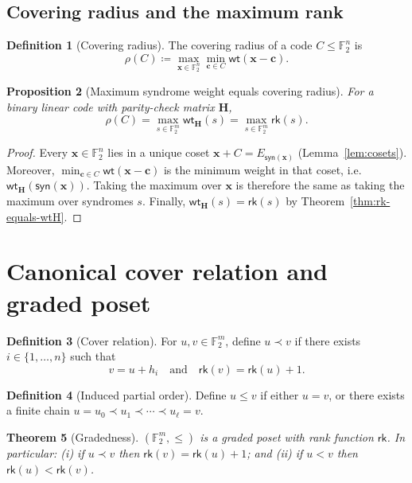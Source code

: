 \documentclass[11pt,twoside,leqno]{article}
\theoremstyle{definition}
\newtheorem{definition}{Definition}[section]
\theoremstyle{plain}
\newtheorem{theorem}[definition]{Theorem}
\newtheorem{proposition}[definition]{Proposition}
\theoremstyle{remark}
\newcommand{\Ftwo}{\mathbb{F}_2}
\newcommand{\wt}{\mathsf{wt}}
\newcommand{\syn}{\mathsf{syn}}
\newcommand{\rk}{\mathsf{rk}}
\newcommand{\HH}{\mathbf{H}}
\newcommand{\xx}{\mathbf{x}}
\newcommand{\cc}{\mathbf{c}}
\newcommand{\covrad}{\rho}
\begin{document}
\subsection{Covering radius and the maximum rank}
\begin{definition}[Covering radius]\label{def:coveringradius}
The covering radius of a code $C\le \Ftwo^n$ is
\[
\covrad(C)\coloneqq \max_{\xx\in\Ftwo^n}\min_{\cc\in C}\wt(\xx-\cc).
\]
\end{definition}

\begin{proposition}[Maximum syndrome weight equals covering radius]\label{prop:rho}
For a binary linear code with parity-check matrix $\HH$,
\[
\covrad(C)=\max_{s\in\Ftwo^m}\wt_{\HH}(s)=\max_{s\in\Ftwo^m}\rk(s).
\]
\end{proposition}

\begin{proof}
Every $\xx\in\Ftwo^n$ lies in a unique coset $\xx+C=E_{\syn(\xx)}$ (Lemma~\ref{lem:cosets}).
Moreover, $\min_{\cc\in C}\wt(\xx-\cc)$ is the minimum weight in that coset, i.e.\ $\wt_{\HH}(\syn(\xx))$.
Taking the maximum over $\xx$ is therefore the same as taking the maximum over syndromes $s$.
Finally, $\wt_{\HH}(s)=\rk(s)$ by Theorem~\ref{thm:rk-equals-wtH}.
\end{proof}

\section{Canonical cover relation and graded poset}\label{sec:poset}

\begin{definition}[Cover relation]\label{def:cover}
For $u,v\in\Ftwo^m$, define $u\prec v$ if there exists $i\in\{1,\dots,n\}$ such that
\[
v=u+h_i
\quad\text{and}\quad
\rk(v)=\rk(u)+1.
\]
\end{definition}

\begin{definition}[Induced partial order]\label{def:order}
Define $u\le v$ if either $u=v$, or there exists a finite chain
$u=u_0\prec u_1\prec\cdots\prec u_\ell=v$.
\end{definition}

\begin{theorem}[Gradedness]\label{thm:graded}
$(\Ftwo^m,\le)$ is a graded poset with rank function $\rk$. In particular:
(i) if $u\prec v$ then $\rk(v)=\rk(u)+1$; and
(ii) if $u<v$ then $\rk(u)<\rk(v)$.
\end{theorem}
\end{document}
